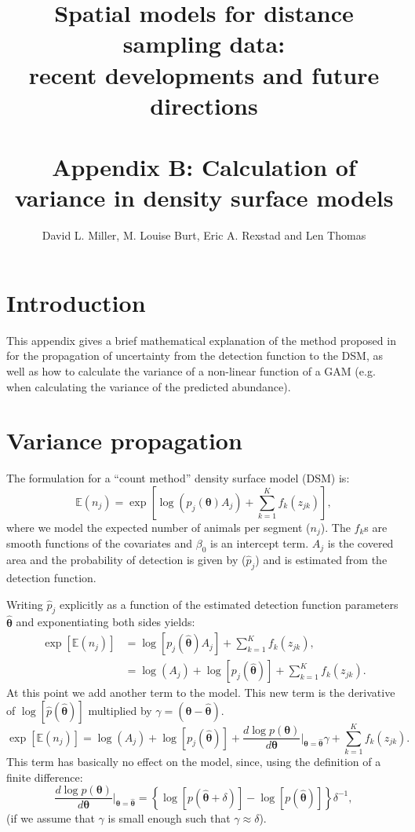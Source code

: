 \documentclass[11pt]{amsart}
\title{{\Small Spatial models for distance sampling data:\\ recent developments and future directions}\\ \mbox{} \\ Appendix B: Calculation of variance in density surface models}
\author{David L. Miller, M. Louise Burt, Eric A. Rexstad and Len Thomas}
\begin{document}
\maketitle


\section{Introduction}

This appendix gives a brief mathematical explanation of the method proposed in \cite{WILLIAMS:2011in} for the propagation of uncertainty from the detection function to the DSM, as well as how to calculate the variance of a non-linear function of a GAM (e.g. when calculating the variance of the predicted abundance).

\section{Variance propagation}

The formulation for a ``count method'' density surface model (DSM) is:
\begin{equation*}
\mathbb{E}(n_j) = \exp\left[ \log\left(p_j(\bm{\theta})A_j\right) + \sum_{k=1}^K f_k(z_{jk}) \right],
\end{equation*}
where we model the expected number of animals per segment ($n_j$). The $f_k$s are smooth functions of the covariates and $\beta_0$ is an intercept term. $A_j$ is the covered area and the probability of detection is given by ($\hat{p}_j$) and is estimated from the detection function.

Writing $\hat{p}_j$ explicitly as a function of the estimated detection function parameters $\bm{\hat{\theta}}$ and exponentiating both sides yields:
\begin{align*}
\exp\left[ \mathbb{E}(n_j) \right] &= \log\left[p_j(\bm{\hat{\theta}})A_j\right] + \sum_{k=1}^K f_k(z_{jk}), \\
&= \log\left(A_j\right) + \log\left[p_j(\bm{\hat{\theta}})\right] + \sum_{k=1}^K f_k(z_{jk}).
\end{align*}
At this point we add another term to the model. This new term is the derivative of $\log\left[ \hat{p}(\bm{\hat{\theta}})\right]$ multiplied by $\gamma =(\bm{\theta} - \bm{\hat{\theta}})$.
\begin{equation}
\exp\left[ \mathbb{E}(n_j) \right] = \log\left(A_j\right) + \log\left[p_j(\bm{\hat{\theta}})\right] + \frac{ d \log p(\bm{\theta})}{d\bm{\theta}} \Big\vert_{\bm{\theta} = \hat{\bm{\theta}}} \gamma + \sum_{k=1}^K f_k(z_{jk}).
\label{extra-term}
\end{equation}
This term has basically no effect on the model, since, using the definition of a finite difference:
\begin{equation*}
\frac{ d \log p(\bm{\theta})}{d\bm{\theta}} \Big\vert_{\bm{\theta} = \hat{\bm{\theta}}} = \left\{\log\left[p(\hat{\bm{\theta}} + \delta)\right] - \log\left[p(\hat{\bm{\theta}})\right]\right\}\delta^{-1},
\end{equation*}
(if we assume that $\gamma$ is small enough such that $\gamma \approx \delta$).
\end{document}
